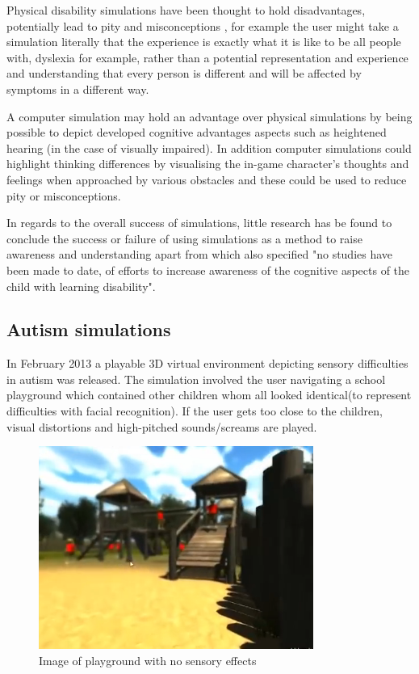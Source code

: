 \documentclass[11pt]{report}
\begin{document}
Physical disability simulations have been thought to hold disadvantages, potentially lead to pity and misconceptions \cite{dd}, for example the user might take a simulation literally that the experience is exactly what it is like to be all people with, dyslexia for example, rather than a potential representation and experience and understanding that every person is different and will be affected by symptoms in a different way.

A computer simulation may hold an advantage over physical simulations by being possible to depict developed cognitive advantages aspects such as heightened hearing (in the case of visually impaired). In addition computer simulations could highlight thinking differences by visualising the in-game character's thoughts and feelings when approached by various obstacles and these could be used to reduce pity or misconceptions.

In regards to the overall success of simulations, little research has be found to conclude the success or failure of using simulations as a method to raise awareness and understanding apart from \cite{dyslexicsimpar} which also specified "no studies have been made to date, of efforts to increase awareness of the cognitive aspects of the child with learning disability".

\subsection{Autism simulations}

In February 2013 a playable 3D virtual environment depicting sensory difficulties in autism was released. The simulation involved the user navigating a school playground which contained other children whom all looked identical(to represent difficulties with facial recognition). If the user gets too close to the children, visual distortions and high-pitched sounds/screams are played. 

\begin{figure}[H]
\centering
\includegraphics[width=90mm]{images/litreview/autisim1.png}
\caption{Image of playground with no sensory effects}
\label{autisim1}
\end{figure}
\end{document}
